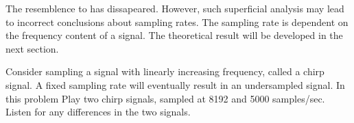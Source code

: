 \documentclass{article}
\begin{document}
\begin{CellGroup}
\begin{CellGroup}

\end{CellGroup}
The resemblence to  has dissapeared. However, such superficial analysis may lead to incorrect conclusions about sampling rates.
The sampling rate is dependent on the frequency content of a signal. The theoretical result  will be developed in the next section.



\begin{CellGroup}
Consider sampling a signal with linearly increasing frequency, called a chirp signal. A fixed sampling rate will eventually result in an undersampled
signal. In this problem Play two chirp signals, sampled at 8192 and 5000 samples/sec. Listen for any differences in the two signals.

\begin{CellGroup}

\end{CellGroup}

\end{CellGroup}

\end{CellGroup}
\end{document}
